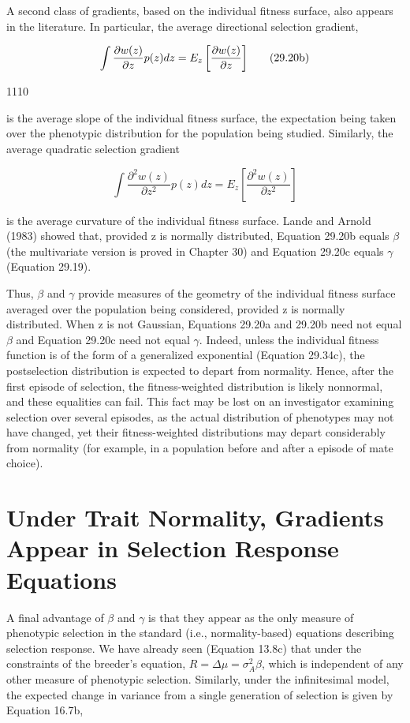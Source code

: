 \documentclass{article}
\begin{document}
A second class of gradients, based on the individual fitness surface, also appears in the literature. In particular, the average directional selection gradient,

\begin{equation}
\begin{align*}\int{\partial w(z)\over\partial z}p(z)dz=E_z\left[{\partial w(z)\over\partial z}\right]\end{align*}
\tag{29.20b}
\label{eq:29_20b}
\end{equation}

1110

is the average slope of the individual fitness surface, the expectation being taken over the phenotypic distribution for the population being studied. Similarly, the average quadratic selection gradient

\begin{equation}
\int\frac{\partial^{2}w(z)}{\partial z^{2}}p(z)dz=E_{z}\left[\frac{\partial^{2}w(z)}{\partial z^{2}}\right]
\tag{29.20c}
\label{eq:29_20c}
\end{equation}

is the average curvature of the individual fitness surface. Lande and Arnold (1983) showed that, provided z is normally distributed, Equation 29.20b equals  $ \beta $ (the multivariate version is proved in Chapter 30) and Equation 29.20c equals  $ \gamma $ (Equation 29.19).

Thus,  $ \beta $ and  $ \gamma $ provide measures of the geometry of the individual fitness surface averaged over the population being considered, provided z is normally distributed. When z is not Gaussian, Equations 29.20a and 29.20b need not equal  $ \beta $ and Equation 29.20c need not equal  $ \gamma $. Indeed, unless the individual fitness function is of the form of a generalized exponential (Equation 29.34c), the postselection distribution is expected to depart from normality. Hence, after the first episode of selection, the fitness-weighted distribution is likely nonnormal, and these equalities can fail. This fact may be lost on an investigator examining selection over several episodes, as the actual distribution of phenotypes may not have changed, yet their fitness-weighted distributions may depart considerably from normality (for example, in a population before and after a episode of mate choice).

\section{Under Trait Normality, Gradients Appear in Selection Response Equations}
A final advantage of  $ \beta $ and  $ \gamma $ is that they appear as the only measure of phenotypic selection in the standard (i.e., normality-based) equations describing selection response. We have already seen (Equation 13.8c) that under the constraints of the breeder's equation,  $ R = \Delta \mu = \sigma_A^2 \beta $, which is independent of any other measure of phenotypic selection. Similarly, under the infinitesimal model, the expected change in variance from a single generation of selection is given by Equation 16.7b,
\end{document}
